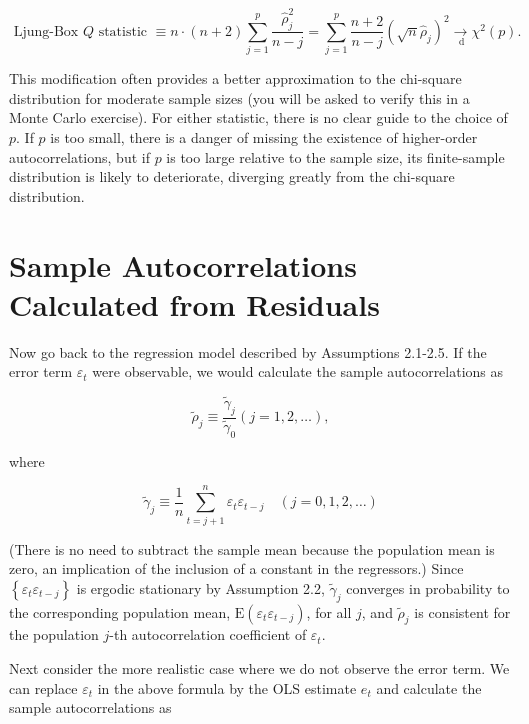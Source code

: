 \documentclass[10pt]{article}
\begin{document}
\begin{equation*}
\text { Ljung-Box } Q \text { statistic } \equiv n \cdot(n+2) \sum_{j=1}^{p} \frac{\hat{\rho}_{j}^{2}}{n-j}=\sum_{j=1}^{p} \frac{n+2}{n-j}\left(\sqrt{n} \hat{\rho}_{j}\right)^{2} \underset{\mathrm{~d}}{\rightarrow} \chi^{2}(p) . \tag{2.10.5}
\end{equation*}


This modification often provides a better approximation to the chi-square distribution for moderate sample sizes (you will be asked to verify this in a Monte Carlo exercise). For either statistic, there is no clear guide to the choice of $p$. If $p$ is too small, there is a danger of missing the existence of higher-order autocorrelations, but if $p$ is too large relative to the sample size, its finite-sample distribution is likely to deteriorate, diverging greatly from the chi-square distribution.

\section*{Sample Autocorrelations Calculated from Residuals}
Now go back to the regression model described by Assumptions 2.1-2.5. If the error term $\varepsilon_{t}$ were observable, we would calculate the sample autocorrelations as


\begin{equation*}
\tilde{\rho}_{j} \equiv \frac{\tilde{\gamma}_{j}}{\tilde{\gamma}_{0}}(j=1,2, \ldots), \tag{2.10.6}
\end{equation*}


where


\begin{equation*}
\tilde{\gamma}_{j} \equiv \frac{1}{n} \sum_{t=j+1}^{n} \varepsilon_{t} \varepsilon_{t-j} \quad(j=0,1,2, \ldots) \tag{2.10.7}
\end{equation*}


(There is no need to subtract the sample mean because the population mean is zero, an implication of the inclusion of a constant in the regressors.) Since $\left\{\varepsilon_{t} \varepsilon_{t-j}\right\}$ is ergodic stationary by Assumption 2.2, $\tilde{\gamma}_{j}$ converges in probability to the corresponding population mean, $\mathrm{E}\left(\varepsilon_{t} \varepsilon_{t-j}\right)$, for all $j$, and $\tilde{\rho}_{j}$ is consistent for the population $j$-th autocorrelation coefficient of $\varepsilon_{t}$.

Next consider the more realistic case where we do not observe the error term. We can replace $\varepsilon_{t}$ in the above formula by the OLS estimate $e_{t}$ and calculate the sample autocorrelations as
\end{document}

